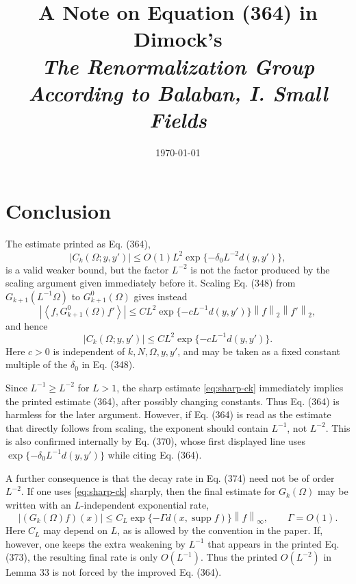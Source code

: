 \documentclass[11pt]{article}
\title{A Note on Equation (364) in Dimock's\\
\emph{The Renormalization Group According to Balaban, I. Small Fields}}
\author{}
\date{\today}
\newcommand{\supp}{\operatorname{supp}}
\newcommand{\ip}[2]{\left\langle #1,#2\right\rangle}
\newcommand{\norm}[1]{\left\|#1\right\|}
\begin{document}
\maketitle

\section*{Conclusion}

The estimate printed as Eq. (364),
\begin{equation}
  |C_k(\Omega;y,y')|
  \le O(1)L^2 \exp\{-\delta_0 L^{-2} d(y,y')\},
  \tag{364}
\end{equation}
is a valid weaker bound, but the factor \(L^{-2}\) is not the factor produced by
the scaling argument given immediately before it.  Scaling Eq. (348) from
\(G_{k+1}(L^{-1}\Omega)\) to \(G^0_{k+1}(\Omega)\) gives instead
\begin{equation}
  |\ip{f}{G^0_{k+1}(\Omega)f'}|
  \le C L^2 \exp\{-c L^{-1}d(y,y')\}\norm{f}_2\norm{f'}_2,
  \label{eq:sharp-g0}
\end{equation}
and hence
\begin{equation}
  |C_k(\Omega;y,y')|
  \le C L^2 \exp\{-c L^{-1}d(y,y')\}.
  \label{eq:sharp-ck}
\end{equation}
Here \(c>0\) is independent of \(k,N,\Omega,y,y'\), and may be taken as a fixed
constant multiple of the \(\delta_0\) in Eq. (348).

Since \(L^{-1}\ge L^{-2}\) for \(L>1\), the sharp estimate
\eqref{eq:sharp-ck} immediately implies the printed estimate (364), after
possibly changing constants.  Thus Eq. (364) is harmless for the later argument.
However, if Eq. (364) is read as the estimate that directly follows from scaling,
the exponent should contain \(L^{-1}\), not \(L^{-2}\).  This is also confirmed
internally by Eq. (370), whose first displayed line uses
\(\exp\{-\delta_0 L^{-1}d(y,y')\}\) while citing Eq. (364).

A further consequence is that the decay rate in Eq. (374) need not be of order
\(L^{-2}\).  If one uses \eqref{eq:sharp-ck} sharply, then the final estimate for
\(G_k(\Omega)\) may be written with an \(L\)-independent exponential rate,
\[
  |(G_k(\Omega)f)(x)|
  \le C_L\exp\{-\Gamma d(x,\supp f)\}\norm{f}_{\infty},
  \qquad \Gamma=O(1).
\]
Here \(C_L\) may depend on \(L\), as is allowed by the convention in the paper.
If, however, one keeps the extra weakening by \(L^{-1}\) that appears in the
printed Eq. (373), the resulting final rate is only \(O(L^{-1})\).  Thus the
printed \(O(L^{-2})\) in Lemma 33 is not forced by the improved Eq. (364).
\end{document}
